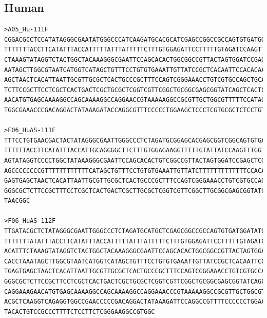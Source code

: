 \subsection{Human}
\begingroup\tiny
\begin{verbatim}
>A05_Hu-111F
CGGACGCCTCCATATAGGGCGAATATGGGCCCATCAAGATGCACGCATCGAGCCGGCCGCCAGTGTGATGGATATCTGCAGAATTCGCCCTTGGCCACGCGTCGACTAGTACTTTTTTTT
TTTTTTTACCTTCATATTTACCATTTTTATTTATTTTTCTTTGTGGAGATTCCTTTTTGTAGATCCAAGTTTGTTGCTGGTGTTATTTTCCTTTTACTTGAAAAAATTTCTTAAACATTT
CTAAAGTATAGGTCTACTGGCTACAAAGGGCGAATTCCAGCACACTGGCGGCCGTTACTAGTGGATCCGAGCTCGGTACCAAGCTTGATGCATAGCTTGAGTATTCTATAGTGTCACCTA
AATAGCTTGGCGTAATCATGGTCATAGCTGTTTCCTGTGTGAAATTGTTATCCGCTCACAATTCCACACAACATACGAGCCGGAAGCATAAAGTGTAAAGCCTGGGGTGCCTAATGAGTG
AGCTAACTCACATTAATTGCGTTGCGCTCACTGCCCGCTTTCCAGTCGGGAAACCTGTCGTGCCAGCTGCATTAATGAATCGGCCAACGCGCGGGGAGAGGCGGTTTGCGTATTGGGCGC
TCTTCCGCTTCCTCGCTCACTGACTCGCTGCGCTCGGTCGTTCGGCTGCGGCGAGCGGTATCAGCTCACTCAAAGGCGGTAATACGGTTATCCACAGAATCAGGGGATAACGCAGGAAAG
AACATGTGAGCAAAAGGCCAGCAAAAGGCCAGGAACCGTAAAAAGGCCGCGTTGCTGGCGTTTTTCCATAGGCTCCGCCCCCCTGACGAGCATCACAAAAATCGACGCTCAAGTCAGAGG
TGGCGAAACCCGACAGGACTATAAAGATACCAGGCGTTTCCCCCTGGAAGCTCCCTCGTGCGCTCTCCTGTTCCGACCCTGCCCGCTTACCGGATACCTGTCG

>E06_HuAS-111F
TTTCCTGTGAACGACTACTATAGGGCGAATTGGGCCCTCTAGATGCGGAGCACGAGCGGTCGGCAGTGTGATGGATATCTGCAGGGACGCCCTTGGGAGAGCGACTAGTACTTTTTTTTT
TTTTTTACCTTCATATTTACCATTGCAGGGGCTTCTTTGTGGAGAAGGTTTTTGTATTATCCAAGTTTGGTGCTGGTGTTATTTTCCTTTTACTTGAAAAAATTTTAATAACATTTCTAA
AGTATAGGTCCCCTGGCTATAAAGGGCGAATTCCAGCACACTGTCGGCCGTTACTAGTGGATCCGAGCTCGGTACCAAGCTTGATGCATTTTATAGATTATTCTATTTTGTAATATTAAT
AGCCCCCCCCGTTTTTTTTTTTTCATAGCTGTTTCCTGTGTGAAATTGTTATCTTTTTTTTTTTTTCCACACAACATACTTTTTCGGAAGCATAAAGTGTTTTTTTTTGTGGTGCCTAAT
GAGTGAGCTAACTCACATTAATTGCGTTGCGCTCACTGCCCGCTTTCCAGTCGGGAAACCTGTCGTGCCAGCTGCATTAATGAATCGGCCAACGCGCGGGGAGAGGCGGTTTGCGTATTT
GGGCGCTCTTCCGCTTTCCTCGCTCACTGACTCGCTTGCGCTCGGTCGTTCGGCTTGCGGCGAGCGGTATCAGCTCACTTAAAGGCGGGTAATTACGGGTTATCCACAGAACCAGGGGGA
TAACGGC

>F06_HuAS-112F
TTGATACGCTCTATAGGGCGAATTGGGCCCTCTAGATGCATGCTCGAGCGGCCGCCAGTGTGATGGATATCTGCAGAATTCGCCCTTGGCCACGCGTCGACTAGTACTTTTTTTTTTTTT
TTTTTTTATATTTACCTTCATATTTACCATTTTTATTTATTTTTCTTTGTGGAGATTCCTTTTTGTAGATCCAAGTTTGTTGCTGGTGTTATTTTCCTTTTACTTGAAAAAATTTCTTAA
ACATTTCTAAAGTATAGGTCTACTGGCTACAAAGGGCGAATTCCAGCACACTGGCGGCCGTTACTAGTGGATCCGAGCTCGGTACCAAGCTTGATGCATAGCTTGAGTATTCTATAGTGT
CACCTAAATAGCTTGGCGTAATCATGGTCATAGCTGTTTCCTGTGTGAAATTGTTATCCGCTCACAATTCCACACAACATACGAGCCGGAAGCATAAAGTGTAAAGCCTGGGGTGCCTAA
TGAGTGAGCTAACTCACATTAATTGCGTTGCGCTCACTGCCCGCTTTCCAGTCGGGAAACCTGTCGTGCCAGCTGCATTAATGAATCGGCCAACGCGCGGGGAGAGGCGGTTTGCGTATT
GGGCGCTCTTCCGCTTCCTCGCTCACTGACTCGCTGCGCTCGGTCGTTCGGCTGCGGCGAGCGGTATCAGCTCACTCAAAGGCGGTAATACGGTTATCCCACAGAATCAGGGGATAACCG
CAGGAAAGAACATGTGAGCAAAAGGCCAGCAAAAGGCCAGGAAACCCGTAAAAAGGCCGCGTTGCTGGCGTTTTTTCCATAGGCTTCCGCCCCCCCCTTGACCAGCATCACCAAAATTTG
ACGCTCAAGGTCAGAGGTGGCCGAACCCCCGACAGGACTATAAAGATTCCAGGCCGTTTTCCCCCCTGGAAGCTCCCCTCCTGCGCTCTCCTCGTTCCGACCCCTGGCCGCTTACCGGAT
TACACTGTCCGCCCTTTTCTCCTTCTCGGGAAGGCCGTGGC


\end{verbatim}
